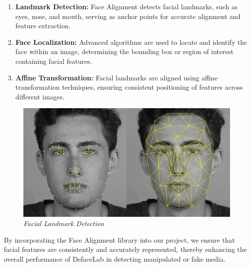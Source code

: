 \begin{enumerate}
    \item \textbf{Landmark Detection:} Face Alignment detects facial landmarks, such as eyes, nose, and mouth, serving as anchor points for accurate alignment and feature extraction.
    
    \item \textbf{Face Localization:} Advanced algorithms are used to locate and identify the face within an image, determining the bounding box or region of interest containing facial features.
    
    \item \textbf{Affine Transformation:} Facial landmarks are aligned using affine transformation techniques, ensuring consistent positioning of features across different images.
    
    
\end{enumerate}

\begin{figure}[htbp]
    \centering
    \includegraphics[width=5in]{img/facial feature.jpg}
    \caption{\textit{Facial Landmark Detection}}
\end{figure}

By incorporating the Face Alignment library into our project, we ensure that facial features are consistently and accurately represented, thereby enhancing the overall performance of DefaceLab in detecting manipulated or fake media.

\newpage
